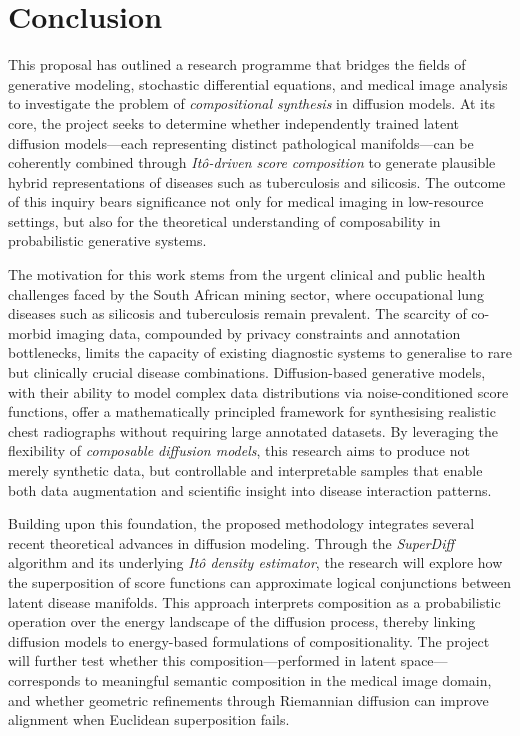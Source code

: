 \chapter{Conclusion}
\label{chap:conclusion}
This proposal has outlined a research programme that bridges the fields of generative modeling, stochastic differential equations, and medical image analysis to investigate the problem of \emph{compositional synthesis} in diffusion models.  
At its core, the project seeks to determine whether independently trained latent diffusion models—each representing distinct pathological manifolds—can be coherently combined through \emph{Itô-driven score composition} to generate plausible hybrid representations of diseases such as tuberculosis and silicosis.  
The outcome of this inquiry bears significance not only for medical imaging in low-resource settings, but also for the theoretical understanding of composability in probabilistic generative systems.

The motivation for this work stems from the urgent clinical and public health challenges faced by the South African mining sector, where occupational lung diseases such as silicosis and tuberculosis remain prevalent.  
The scarcity of co-morbid imaging data, compounded by privacy constraints and annotation bottlenecks, limits the capacity of existing diagnostic systems to generalise to rare but clinically crucial disease combinations.  
Diffusion-based generative models, with their ability to model complex data distributions via noise-conditioned score functions, offer a mathematically principled framework for synthesising realistic chest radiographs without requiring large annotated datasets.  
By leveraging the flexibility of \emph{composable diffusion models}, this research aims to produce not merely synthetic data, but controllable and interpretable samples that enable both data augmentation and scientific insight into disease interaction patterns.

Building upon this foundation, the proposed methodology integrates several recent theoretical advances in diffusion modeling.  
Through the \emph{SuperDiff} algorithm and its underlying \emph{Itô density estimator}, the research will explore how the superposition of score functions can approximate logical conjunctions between latent disease manifolds.  
This approach interprets composition as a probabilistic operation over the energy landscape of the diffusion process, thereby linking diffusion models to energy-based formulations of compositionality.  
The project will further test whether this composition—performed in latent space—corresponds to meaningful semantic composition in the medical image domain, and whether geometric refinements through Riemannian diffusion can improve alignment when Euclidean superposition fails.

